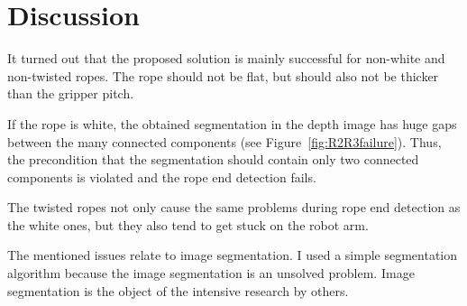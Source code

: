     \section{Discussion}
        It turned out that the proposed solution is mainly successful for non-white and non-twisted ropes. The rope should not be flat, but should also not be thicker than the gripper pitch.

        If the rope is white, the obtained segmentation in the depth image has huge gaps between the many connected components (see Figure~\ref{fig:R2R3failure}). Thus, the precondition that the segmentation should contain only two connected components is violated and the rope end detection fails.

        The twisted ropes not only cause the same problems during rope end detection as the white ones, but they also tend to get stuck on the robot arm.

        The mentioned issues relate to image segmentation. I used a simple segmentation algorithm because the image segmentation is an unsolved problem. Image segmentation is the object of the intensive research by others.

